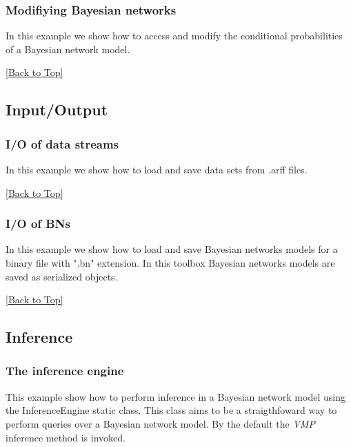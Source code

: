 \documentclass[10pt,a4paper]{article}
\begin{document}
\subsubsection{Modifiying Bayesian networks}\label{sec:bns:models:modif}
In this example we show how to access and modify the conditional probabilities of a Bayesian network model.

\hyperref[sec:bns]{[Back to Top]}\newline 


\subsection{Input/Output}\label{sec:bns:io}

\subsubsection{I/O of data streams}\label{sec:bns:io:iods}
In this example we show how to load and save data sets from .arff files.

\hyperref[sec:bns]{[Back to Top]}\newline 

\subsubsection{I/O of BNs}\label{sec:bns:io:iobn}
In this example we show how to load and save Bayesian networks models for a binary file with ".bn" extension. In this toolbox Bayesian networks models are saved as serialized objects.

\hyperref[sec:bns]{[Back to Top]}\newline 


\subsection{Inference}\label{sec:bns:inference}

\subsubsection{The inference engine}\label{sec:bns:inference:engine}
This example show how to perform inference in a Bayesian network model using the InferenceEngine static class. This class aims to be a straigthfoward way to perform queries over a Bayesian network model. By the default the \textit{VMP} inference method is invoked.
\end{document}
